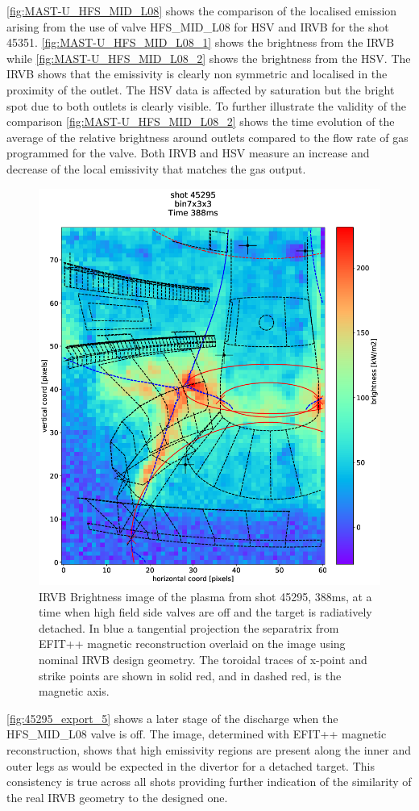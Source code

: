 \autoref{fig:MAST-U_HFS_MID_L08} shows the comparison of the localised emission arising from the use of valve HFS\_MID\_L08 for HSV and IRVB for the shot 45351. \autoref{fig:MAST-U_HFS_MID_L08_1} shows the brightness from the IRVB while \autoref{fig:MAST-U_HFS_MID_L08_2} shows the brightness from the HSV. The IRVB shows that the emissivity is clearly non symmetric and localised in the proximity of the outlet. The HSV data is affected by saturation but the bright spot due to both outlets is clearly visible. To further illustrate the validity of the comparison \autoref{fig:MAST-U_HFS_MID_L08_2} shows the time evolution of the average of the relative brightness around outlets compared to the flow rate of gas programmed for the valve. Both IRVB and HSV measure an increase and decrease of the local emissivity that matches the gas output.

\begin{figure}[!ht]
	\centering
	\includegraphics[width=0.65\linewidth,trim={0 0 0 20},clip]{Chapters/chapter2/figs/IRVB-MASTU_shot-45295_export_5.png}
	\caption{IRVB Brightness image of the plasma from shot 45295, 388ms, at a time when high field side valves are off and the target is radiatively detached. In blue a tangential projection the separatrix from EFIT++ magnetic reconstruction overlaid on the image using nominal IRVB design geometry. The toroidal traces of x-point and strike points are shown in solid red, and in dashed red, is the magnetic axis.}
	\label{fig:45295_export_5}
\end{figure}

\autoref{fig:45295_export_5} shows a later stage of the discharge when the HFS\_MID\_L08 valve is off. The image, determined with EFIT++ magnetic reconstruction\cite{Lao1985}, shows that high emissivity regions are present along the inner and outer legs as would be expected in the divertor for a detached target. This consistency is true across all shots providing further indication of the similarity of the real IRVB geometry to the designed one.%

